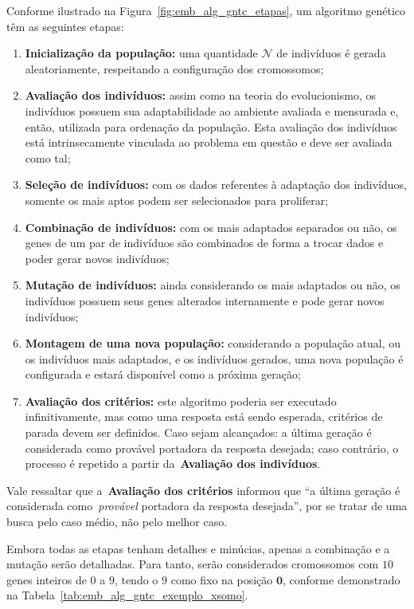 Conforme ilustrado na Figura~\ref{fig:emb_alg_gntc_etapas}, um algoritmo genético têm as seguintes etapas:

\begin{enumerate}
    \item \textbf{Inicialização da população:} uma quantidade $\mathcal{N}$ de indivíduos é gerada aleatoriamente, respeitando a configuração dos cromossomos;
    \item \textbf{Avaliação dos indivíduos:} assim como na teoria do evolucionismo, os indivíduos possuem sua adaptabilidade ao ambiente avaliada e mensurada e, então, utilizada para ordenação da população. Esta avaliação dos indivíduos está intrinsecamente vinculada ao problema em questão e deve ser avaliada como tal;
    \item \textbf{Seleção de indivíduos:} com os dados referentes à adaptação dos indivíduos, somente os mais aptos podem ser selecionados para proliferar;
    \item \textbf{Combinação de indivíduos:} com os mais adaptados separados ou não, os genes de um par de indivíduos são combinados de forma a trocar dados e poder gerar novos indivíduos;
    \item \textbf{Mutação de indivíduos:} ainda considerando os mais adaptados ou não, os indivíduos possuem seus genes alterados internamente e pode gerar novos indivíduos;
    \item \textbf{Montagem de uma nova população:} considerando a população atual, ou os indivíduos mais adaptados, e os indivíduos gerados, uma nova população é configurada e estará disponível como a próxima geração;
    \item \textbf{Avaliação dos critérios:} este algoritmo poderia ser executado infinitivamente, mas como uma resposta está sendo esperada, critérios de parada devem ser definidos. Caso sejam alcançados: a última geração é considerada como provável portadora da resposta desejada; caso contrário, o processo é repetido a partir da~\textbf{Avaliação dos indivíduos}.
\end{enumerate}

Vale ressaltar que a~\textbf{Avaliação dos critérios} informou que ``a última geração é considerada como~\emph{provável} portadora da resposta desejada'', por se tratar de uma busca pelo caso médio, não pelo melhor caso.

Embora todas as etapas tenham detalhes e minúcias, apenas a combinação e a mutação serão detalhadas. Para tanto, serão considerados cromossomos com $10$ genes inteiros de $0$ a $9$, tendo o $9$ como fixo na posição $\mathbf{0}$, conforme demonstrado na Tabela~\ref{tab:emb_alg_gntc_exemplo_xsomo}.

